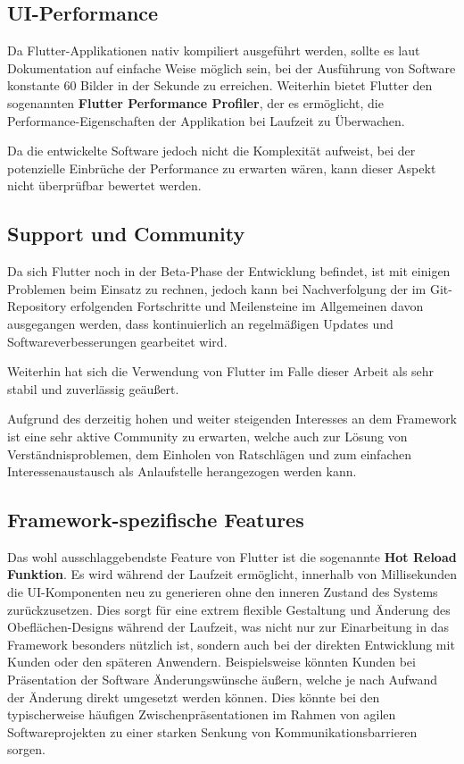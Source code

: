 \documentclass[bibliography=totoc,listof=totoc,BCOR=5mm,DIV=12,oneside]{scrbook}
\begin{document}
\subsection{UI-Performance}
\par Da Flutter-Applikationen nativ kompiliert ausgeführt werden, sollte es laut Dokumentation auf einfache Weise möglich sein, bei der Ausführung von Software konstante 60 Bilder in der Sekunde zu erreichen\citep{Flu3}. Weiterhin bietet Flutter den sogenannten \textbf{Flutter Performance Profiler}\citep{FlutterPerformanceProfiler}, der es ermöglicht, die Performance-Eigenschaften der Applikation bei Laufzeit zu Überwachen. 
\par \bigskip Da die entwickelte Software jedoch nicht die Komplexität aufweist, bei der potenzielle Einbrüche der Performance zu erwarten wären, kann dieser Aspekt nicht überprüfbar bewertet werden.

\subsection{Support und Community}
\par Da sich Flutter noch in der Beta-Phase der Entwicklung befindet, ist mit einigen Problemen beim Einsatz zu rechnen, jedoch kann bei Nachverfolgung der im Git-Repository erfolgenden Fortschritte und Meilensteine im Allgemeinen davon ausgegangen werden, dass kontinuierlich an regelmäßigen Updates und Softwareverbesserungen gearbeitet wird.
\par \bigskip Weiterhin hat sich die Verwendung von Flutter im Falle dieser Arbeit als sehr stabil und zuverlässig geäußert.
\par \bigskip Aufgrund des derzeitig hohen und weiter steigenden Interesses an dem Framework ist eine sehr aktive Community zu erwarten, welche auch zur Lösung von Verständnisproblemen, dem Einholen von Ratschlägen und zum einfachen Interessenaustausch als Anlaufstelle herangezogen werden kann.

\subsection{Framework-spezifische Features}
\par Das wohl ausschlaggebendste Feature von Flutter ist die sogenannte \textbf{Hot Reload Funktion}. Es wird während der Laufzeit ermöglicht, innerhalb von Millisekunden die UI-Komponenten neu zu generieren ohne den inneren Zustand des Systems zurückzusetzen. Dies sorgt für eine extrem flexible Gestaltung und Änderung des Obeflächen-Designs während der Laufzeit, was nicht nur zur Einarbeitung in das Framework besonders nützlich ist, sondern auch bei der direkten Entwicklung mit Kunden oder den späteren Anwendern. Beispielsweise könnten Kunden bei Präsentation der Software Änderungswünsche äußern, welche je nach Aufwand der Änderung direkt umgesetzt werden können. Dies könnte bei den typischerweise häufigen Zwischenpräsentationen im Rahmen von agilen Softwareprojekten zu einer starken Senkung von Kommunikationsbarrieren sorgen.
\end{document}
